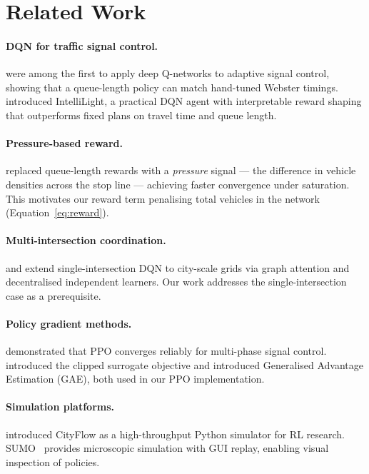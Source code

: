 \documentclass[twoside,11pt]{article}
\begin{document}
\section{Related Work}

\paragraph{DQN for traffic signal control.}
\citet{li2016traffic} were among the first to apply deep Q-networks to adaptive
signal control, showing that a queue-length policy can match hand-tuned Webster
timings.  \citet{wei2018intellilight} introduced IntelliLight, a practical DQN
agent with interpretable reward shaping that outperforms fixed plans on travel
time and queue length.

\paragraph{Pressure-based reward.}
\citet{wei2019presslight} replaced queue-length rewards with a \emph{pressure}
signal — the difference in vehicle densities across the stop line — achieving
faster convergence under saturation.  This motivates our reward term penalising
total vehicles in the network (Equation~\ref{eq:reward}).

\paragraph{Multi-intersection coordination.}
\citet{wei2019colight} and \citet{chen2020toward} extend single-intersection
DQN to city-scale grids via graph attention and decentralised independent
learners.  Our work addresses the single-intersection case as a prerequisite.

\paragraph{Policy gradient methods.}
\citet{liang2019deep} demonstrated that PPO converges reliably for multi-phase
signal control.  \citet{schulman2017proximal} introduced the clipped surrogate
objective and \citet{schulman2015high} introduced Generalised Advantage
Estimation (GAE), both used in our PPO implementation.

\paragraph{Simulation platforms.}
\citet{zhang2019cityflow} introduced CityFlow as a high-throughput Python
simulator for RL research.  SUMO~\citep{behrisch2011sumo} provides
microscopic simulation with GUI replay, enabling visual inspection of policies.
\end{document}

